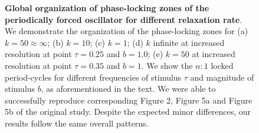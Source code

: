 \begin{figure}[tbph]
    \hfil
    
\caption{\textbf{Global organization of phase-locking zones of the periodically forced oscillator for different relaxation rate}. We demonstrate the organization of the phase-locking zones for (a) $k = 50 \approx \infty$; (b) $k = 10$; (c) $k = 1$; (d) $k$ infinite at increased resolution at point $\tau = 0.25$ and $b = 1.0$; (e) $k = 50$ at increased resolution at point $\tau = 0.35$ and $b = 1$. We show the $n:1$ locked period-cycles for different frequencies of stimulus $\tau$ and magnitude of stimulus $b$, as aforementioned in the text. We were able to successfully reproduce corresponding Figure 2, Figure 5a and Figure 5b of the original study. Despite the expected minor differences, our results follow the same overall patterns.}
    \label{replic}
\end{figure}

